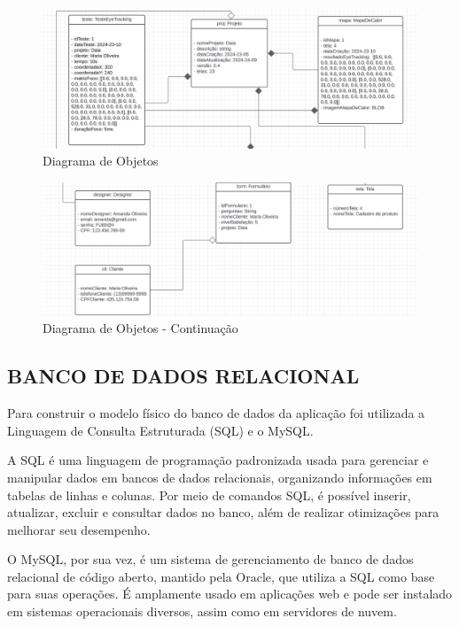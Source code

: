 \begin{figure}[H]
    \centering
    \caption{Diagrama de Objetos}%
    \label{fig:pg-objetos}
    \includegraphics[width=0.72\linewidth]{Illustrations/objetos1.png}
\end{figure}

\vspace{12pt}

\begin{figure}[H]
    \centering
    \caption{Diagrama de Objetos - Continuação}%
    \label{fig:pg-objetos2}
    \includegraphics[width=0.72\linewidth]{Illustrations/objetos2.png}
\end{figure}

\subsection*{BANCO DE DADOS RELACIONAL}
Para construir o modelo físico do banco de dados da aplicação foi utilizada a Linguagem de Consulta Estruturada (SQL) e o MySQL.

A SQL é uma linguagem de programação padronizada usada para gerenciar e manipular dados em bancos de dados relacionais, organizando informações em tabelas de linhas e colunas. Por meio de comandos SQL, é possível inserir, atualizar, excluir e consultar dados no banco, além de realizar otimizações para melhorar seu desempenho.

O MySQL, por sua vez, é um sistema de gerenciamento de banco de dados relacional de código aberto, mantido pela Oracle, que utiliza a SQL como base para suas operações. É amplamente usado em aplicações web e pode ser instalado em sistemas operacionais diversos, assim como em servidores de nuvem. \textcite{Amazon}\newline

